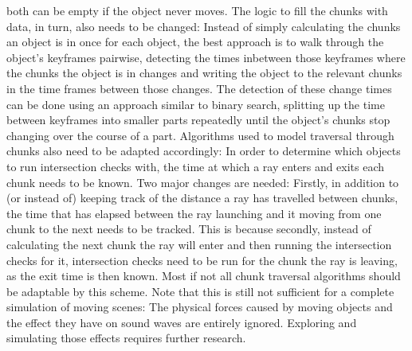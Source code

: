 both can be empty if the object never moves.
\newline
The logic to fill the chunks with data, in turn, also needs to be changed:
Instead of simply calculating the chunks an object is in once for each object,
the best approach is to walk through the object's keyframes pairwise,
detecting the times inbetween those keyframes where the chunks the object is in changes
and writing the object to the relevant chunks in the time frames between those changes.
The detection of these change times can be done using an approach similar to binary search,
splitting up the time between keyframes into smaller parts repeatedly
until the object's chunks stop changing over the course of a part.
\newline
Algorithms used to model traversal through chunks also need to be adapted accordingly:
In order to determine which objects to run intersection checks with,
the time at which a ray enters and exits each chunk needs to be known.
\newline
Two major changes are needed:
Firstly, in addition to (or instead of) keeping track of the distance a ray has travelled between chunks,
the time that has elapsed between the ray launching and it moving from one chunk to the next needs to be tracked.
This is because secondly, instead of calculating the next chunk the ray will enter and then running the intersection checks for it,
intersection checks need to be run for the chunk the ray is leaving, as the exit time is then known.
\newline
Most if not all chunk traversal algorithms should be adaptable by this scheme.
\newline
Note that this is still not sufficient for a complete simulation of moving scenes:
The physical forces caused by moving objects and the effect they have on sound waves are entirely ignored.
Exploring and simulating those effects requires further research.
